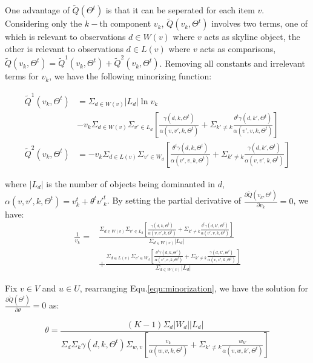 \documentclass[sigconf]{acmart}
\begin{document}
One advantage of $\tilde{Q}(\Theta^t)$ is that it can be seperated for each item $v$. Considering only the $k-$th component $v_k$, $\tilde{Q}(v_k,\Theta^t)$ involves two terms, one of which is relevant to observations $d\in W(v)$ where $v$ acts as skyline object, the other is relevant to observations $d \in L(v)$ where $v$ acts as comparisons, $\tilde{Q}(v_k,\Theta^t)=\tilde{Q}^1(v_k,\Theta^t)+\tilde{Q}^2(v_k,\Theta^t)$. Removing all constants and irrelevant terms for $v_k$, we have the following minorizing function:

\begin{align*}%
\tilde{Q}^1(v_k,\Theta^t) & = \Sigma_{d\in W(v)} |L_d| \ln v_k \\\nonumber
& -v_k\Sigma_{d\in W(v)}\Sigma_{v'\in L_d} [\frac{\gamma(d,k,\Theta^t)}{ \alpha(v,v',k,\Theta^t)} +\Sigma_{k'\neq k}\frac{\theta^t\gamma(d,k',\Theta^t)}{\alpha(v',v,k,\Theta^t)}]\\ \nonumber
\tilde{Q}^2(v_k,\Theta^t) & = -v_k \Sigma_{d\in L(v)}\Sigma_{v'\in W_d} [\frac{\theta^t \gamma(d,k,\Theta^t)}{\alpha(v',v,k,\Theta^t)}+\Sigma_{k'\neq k} \frac{\gamma(d,k',\Theta^t)}{\alpha(v,v',k,\Theta^t)}] 
\end{align*}

where $|L_d|$ is the number of objects being dominanted in $d$, $\alpha(v,v',k,\Theta^t)=v_k^t + \theta^t {v'}_k^t$. By setting the partial derivative of $\frac{\partial \tilde{Q}(v_k,\Theta^t)}{\partial v_k}=0$, we have:
\begin{align}\label{equ:v}
\frac{1}{v_k}= &\frac{\Sigma_{d\in W(v)}\Sigma_{v'\in L_d} [\frac{\gamma(d,k,\Theta^t)}{ \alpha(v,v',k,\Theta^t)} +\Sigma_{k'\neq k}\frac{\theta^t\gamma(d,k',\Theta^t)}{\alpha(v',v,k,\Theta^t)}]}{\Sigma_{d\in W(v)}|L_d|}\\\nonumber
 & + \frac{\Sigma_{d\in L(v)}\Sigma_{v'\in W_d} [\frac{\theta^t \gamma(d,k,\Theta^t)}{\alpha(v',v,k,\Theta^t)}+\Sigma_{k'\neq k} \frac{\gamma(d,k',\Theta^t)}{\alpha(v,v',k,\Theta^t)}] }{\Sigma_{d\in W(v)}|L_d|}
\end{align}

Fix $v \in V$ and $u \in U$, rearranging Equ.\ref{equ:minorization}, we have the solution for $\frac{\partial \tilde{Q}(\Theta^t)}{\partial \theta}=0$ as:

\begin{equation}\label{equ:theta}
\theta = \frac{(K-1)\Sigma_d |W_d| |L_d|}{\Sigma_d \Sigma_k \gamma(d,k,\Theta^t)\Sigma_{w,v} [\frac{v_k}{\alpha(w,v,k,\Theta^t)}+\Sigma_{k'\neq k} \frac{w_{k'}}{\alpha(v,w,k',\Theta^t)}]}
\end{equation}
\end{document}
